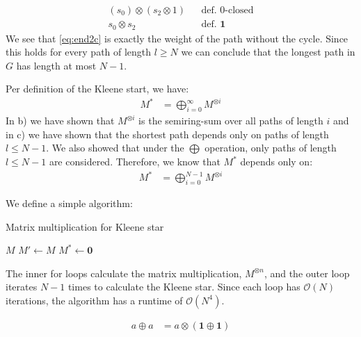 \documentclass[a4paper,12pt]{ETHexercise}
\begin{document}
\begin{question}
\begin{subquestion}
\begin{align}
			\left( s_0 \right) \otimes \left( s_2 \otimes 1 \right) &  & \text{def. $0$-closed}                    \\
			s_0 \otimes s_2                                         &  & \text{def. $\mathbf{1}$} \label{eq:end2c}
		\end{align}
		We see that \cref{eq:end2c} is exactly the weight of the path without the cycle. Since this holds for every path of length $l \geq N$ we can conclude that the longest path in $G$ has length at most $N - 1$.\\
	\end{subquestion}
	\begin{subquestion}
		Per definition of the Kleene start, we have:
		\begin{align}
			M^* & = \bigoplus_{i=0}^{\infty} M^{\otimes i}
		\end{align}
		In b) we have shown that $M^{\otimes i}$ is the semiring-sum over all paths of length $i$ and in c) we have shown that the shortest path depends only on paths of length $l \leq N-1$. We also showed that under the $\bigoplus$ operation, only paths of length $l \leq N-1$ are considered. Therefore, we know that $M^*$ depends only on:
		\begin{align}
			M^{*} & = \bigoplus_{i=0}^{N-1} M^{\otimes i}
		\end{align}
	\end{subquestion}
	\begin{subquestion}
		We define a simple algorithm:\\
		\begin{algorithm}[H]
			\label{M_star}
			\caption{Matrix multiplication for Kleene star}
			$M$\;
			$M' \gets M$\;
			$M^* \gets \mathbf{0}$\;
		\end{algorithm}
		The inner for loops calculate the matrix multiplication, $M^{\otimes n}$, and the outer loop iterates $N-1$ times to calculate the Kleene star. Since each loop has $\mathcal{O}(N)$ iterations, the algorithm has a runtime of $\mathcal{O}(N^4)$.\\
	\end{subquestion}
	\begin{subquestion}
		\begin{align}
			a \oplus a & = a \otimes \left( \mathbf{1} \oplus \mathbf{1} \right)                               \\

\end{align}
\end{subquestion}
\end{question}
\end{document}
